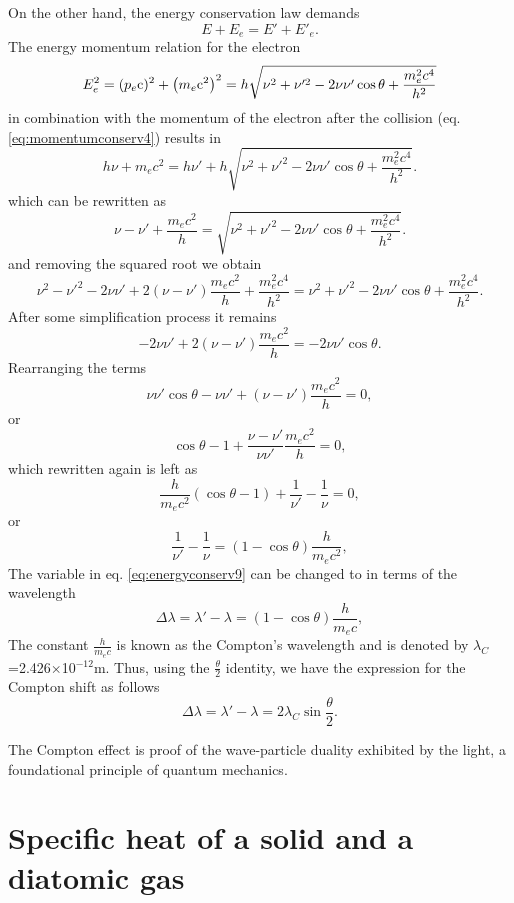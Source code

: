 \documentclass{article}
\begin{document}
On the other hand, the energy conservation law demands 
\begin{equation}\label{eq:energyconserv}
  E+E_e=E'+E'_e.
\end{equation}
The energy momentum relation for the electron
\begin{equation}\label{eq:energyconserv1}
  E_e^2 = (p_e \textrm c)^2 + \left(m_e \textrm c^2\right)^2=h\sqrt{\nu^2+\nu'^2-2\nu\nu'\cos\theta +\frac{m_e^2c^4}{h^2}}
\end{equation}
in combination with the momentum of the electron after the collision (eq. \ref{eq:momentumconserv4}) results in 
\begin{equation}\label{eq:energyconserv2}
  h\nu + m_ec^2 = h\nu' + h\sqrt{\nu^2+\nu'^2-2\nu\nu'\cos\theta +\frac{m_e^2c^4}{h^2}}.
\end{equation}
which can be rewritten as
\begin{equation}\label{eq:energyconserv3}
  \nu - \nu' + \frac{m_ec^2}{h} = \sqrt{\nu^2+\nu'^2-2\nu\nu'\cos\theta +\frac{m_e^2c^4}{h^2}}.
\end{equation}
and removing the squared root we obtain
\begin{equation}\label{eq:energyconserv4}
  \nu^2 - \nu'^2 -2\nu\nu' +2(\nu-\nu')\frac{m_ec^2}{h} + \frac{m^2_ec^4}{h^2}= \nu^2+\nu'^2-2\nu\nu'\cos\theta +\frac{m_e^2c^4}{h^2}.
\end{equation}
After some simplification process it remains
\begin{equation}\label{eq:energyconserv5}
-2\nu\nu' +2(\nu-\nu')\frac{m_ec^2}{h} = -2\nu\nu'\cos\theta.
\end{equation}
Rearranging the terms
\begin{equation}\label{eq:energyconserv6}
  \nu\nu'\cos\theta-\nu\nu' + (\nu-\nu')\frac{m_ec^2}{h} = 0,
\end{equation}
or
\begin{equation}\label{eq:energyconserv7}
  \cos\theta-1 + \frac{\nu-\nu'}{\nu\nu'}\frac{m_ec^2}{h} = 0,
\end{equation}
which rewritten again is left as
\begin{equation}\label{eq:energyconserv8}
  \frac{h}{m_ec^2}(\cos\theta-1) + \frac{1}{\nu'}-\frac{1}{\nu} = 0,
\end{equation}
or
\begin{equation}\label{eq:energyconserv9}
  \frac{1}{\nu'}-\frac{1}{\nu} = (1-\cos\theta)\frac{h}{m_ec^2},
\end{equation}
The variable in eq. \ref{eq:energyconserv9} can be changed to in terms of the wavelength
\begin{equation}\label{eq:energyconserv10}
  \Delta\lambda=\lambda'-\lambda = (1-\cos\theta)\frac{h}{m_ec},
\end{equation}
The constant $\frac{h}{m_ec}$ is known as the Compton's wavelength and is denoted by $\lambda_C$=2.426$\times$10$^{-12}$m. Thus, using the $\frac{\theta}{2}$ identity, we have the expression for the Compton shift as follows
\begin{equation}\label{eq:energyconserv11}
  \Delta\lambda=\lambda'-\lambda = 2\lambda_C\sin\frac{\theta}{2}.
\end{equation}

The Compton effect is proof of the wave-particle duality exhibited by the light, a foundational principle of quantum mechanics.

\section{Specific heat of a solid and a diatomic gas}
\end{document}
